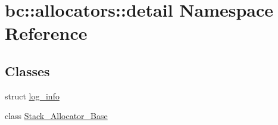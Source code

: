 \hypertarget{namespacebc_1_1allocators_1_1detail}{}\section{bc\+:\+:allocators\+:\+:detail Namespace Reference}
\label{namespacebc_1_1allocators_1_1detail}
\subsection*{Classes}
\begin{DoxyCompactItemize}
\item 
struct \hyperlink{structbc_1_1allocators_1_1detail_1_1log__info}{log\+\_\+info}
\item 
class \hyperlink{classbc_1_1allocators_1_1detail_1_1Stack__Allocator__Base}{Stack\+\_\+\+Allocator\+\_\+\+Base}
\end{DoxyCompactItemize}
